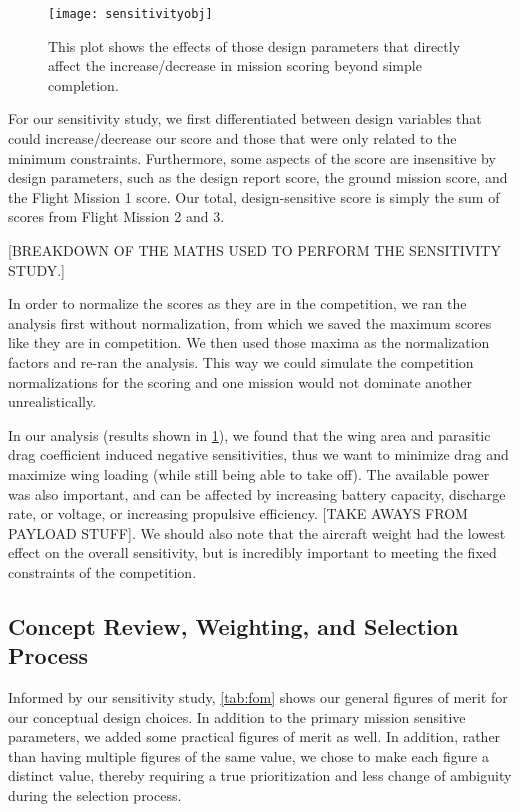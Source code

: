 \documentclass[report]{byu-aero}
\begin{document}
\begin{figure}[h!]
	\centering
		\texttt{[image: sensitivityobj]}
	\caption{This plot shows the effects of those design parameters that directly affect the increase/decrease in mission scoring beyond simple completion.}
	\label{fig:sensitivity}
\end{figure}

For our sensitivity study, we first differentiated between design variables that could increase/decrease our score and those that were only related to the minimum constraints. Furthermore, some aspects of the score are insensitive by design parameters, such as the design report score, the ground mission score, and the Flight Mission 1 score.  Our total, design-sensitive score is simply the sum of scores from Flight Mission 2 and 3.

{\color{\BYUred} [BREAKDOWN OF THE MATHS USED TO PERFORM THE SENSITIVITY STUDY.]}

In order to normalize the scores as they are in the competition, we ran the analysis first without normalization, from which we saved the maximum scores like they are in competition. We then used those maxima as the normalization factors and re-ran the analysis. This way we could simulate the competition normalizations for the scoring and one mission would not dominate another unrealistically.

In our analysis (results shown in \cref{fig:sensitivity}), we found that the wing area and parasitic drag coefficient induced negative sensitivities, thus we want to minimize drag and maximize wing loading (while still being able to take off).  The available power was also important, and can be affected by increasing battery capacity, discharge rate, or voltage, or increasing propulsive efficiency. {\color{BYUred}[TAKE AWAYS FROM PAYLOAD STUFF]}. We should also note that the aircraft weight had the lowest effect on the overall sensitivity, but is incredibly important to meeting the fixed constraints of the competition.




\subsection{Concept Review, Weighting, and Selection Process}
\label{ssec:selectionprocess}

Informed by our sensitivity study, \cref{tab:fom} shows our general figures of merit for our conceptual design choices. In addition to the primary mission sensitive parameters, we added some practical figures of merit as well.  In addition, rather than having multiple figures of the same value, we chose to make each figure a distinct value, thereby requiring a true prioritization and less change of ambiguity during the selection process.
\end{document}
